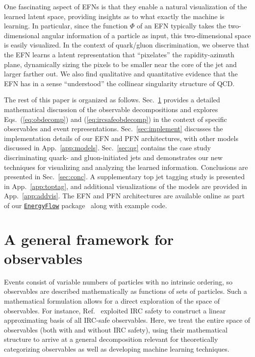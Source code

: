 \documentclass[letterpaper,11pt]{article}
\DeclareRobustCommand{\Sec}[1]{Sec.~\ref{#1}}
\DeclareRobustCommand{\App}[1]{App.~\ref{#1}}
\DeclareRobustCommand{\Eqs}[2]{Eqs.~(\ref{#1}) and (\ref{#2})}
\DeclareRobustCommand{\Ref}[1]{Ref.~\cite{#1}}
\begin{document}
One fascinating aspect of EFNs is that they enable a natural visualization of the learned latent space, providing insights as to what exactly the machine is learning.
%
In particular, since the function $\Phi$ of an EFN typically takes the two-dimensional angular information of a particle as input, this two-dimensional space is easily visualized.
%
In the context of quark/gluon discrimination, we observe that the EFN learns a latent representation that ``pixelates'' the rapidity-azimuth plane, dynamically sizing the pixels to be smaller near the core of the jet and larger farther out.
%
We also find qualitative and quantitative evidence that the EFN has in a sense ``understood'' the collinear singularity structure of QCD.


The rest of this paper is organized as follows.
%
\Sec{sec:math} provides a detailed mathematical discussion of the observable decompositions and explores \Eqs{eq:obdecomp}{eq:ircsafeobdecomp} in the context of specific observables and event representations. 
%
\Sec{sec:implement} discusses the implementation details of our EFN and PFN architectures, with other models discussed in \App{app:models}.
%
\Sec{sec:qg} contains the case study discriminating quark- and gluon-initiated jets and demonstrates our new techniques for visualizing and analyzing the learned information.
%
Conclusions are presented in \Sec{sec:conc}.
%
A supplementary top jet tagging study is presented in \App{app:toptag}, and additional visualizations of the models are provided in \App{app:addvis}. 
%
The EFN and PFN architectures are available online as part of our \href{https://energyflow.network}{\tt EnergyFlow} package~\cite{energyflow} along with example code.


\section{A general framework for observables}
\label{sec:math}


Events consist of variable numbers of particles with no intrinsic ordering, so observables are described mathematically as functions of sets of particles.
%
Such a mathematical formulation allows for a direct exploration of the space of observables.
%
For instance, \Ref{Komiske:2017aww} exploited IRC safety to construct a linear approximating basis of all IRC-safe observables.
%
Here, we treat the entire space of observables (both with and without IRC safety), using their mathematical structure to arrive at a general decomposition relevant for theoretically categorizing observables as well as developing machine learning techniques.
\end{document}
